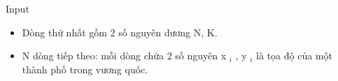 Input
\begin{itemize}
	\item Dòng thứ nhất gồm 2 số nguyên dương N, K.
	\item N dòng tiếp theo: mỗi dòng chứa 2 số nguyên x $_ i $ , y $_ i $ là tọa độ của một thành phố trong vương quốc.
\end{itemize}